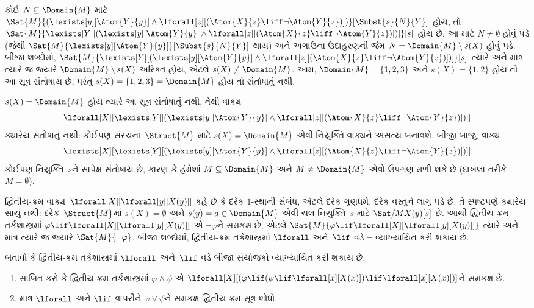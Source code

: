 \begin{ex}
  કોઈ $N \subseteq \Domain{M}$ માટે
  $\Sat{M}{(\lexists[y][\Atom{Y}{y}] \land \lforall[z][(\Atom{X}{z}
  \liff \lnot \Atom{Y}{z})])}[\Subst{s}{N}{Y}]$ હોય, તો
  $\Sat{M}{\lexists[Y][(\lexists[y][\Atom{Y}{y}] \land
  \lforall[z][(\Atom{X}{z} \liff \lnot \Atom{Y}{z})])]}[s]$ હોય છે.
  આ માટે $N \neq \emptyset$ હોવું પડે (જેથી
  $\Sat{M}{\lexists[y][\Atom{Y}{y}]}[\Subst{s}{N}{Y}]$ થાય) અને
  અગાઉના ઉદાહરણની જેમ $N = \Domain{M} \setminus s(X)$ હોવું પડે.
  બીજા શબ્દોમાં,
  $\Sat{M}{\lexists[Y][(\lexists[y][\Atom{Y}{y}] \land
  \lforall[z][(\Atom{X}{z} \liff \lnot \Atom{Y}{z})])]}[s]$
  ત્યારે અને માત્ર ત્યારે જ જ્યારે $\Domain{M} \setminus s(X)$
  અરિક્ત હોય, એટલે $s(X) \neq \Domain{M}$. આમ,
  $\Domain{M} = \{1, 2, 3\}$ અને $s(X) = \{1, 2\}$ હોય તો આ
  સૂત્ર સંતોષાય છે, પરંતુ $s(X) = \{1, 2, 3\} = \Domain{M}$
  હોય તો સંતોષાતું નથી.

  $s(X) = \Domain{M}$ હોય ત્યારે આ સૂત્ર સંતોષાતું નથી, તેથી
  વાક્ય
  \[
  \lforall[X][\lexists[Y][(\lexists[y][\Atom{Y}{y}] \land
      \lforall[z][(\Atom{X}{z} \liff \lnot \Atom{Y}{z})])]]
  \]
  ક્યારેય સંતોષાતું નથી: કોઈપણ સંરચના~$\Struct{M}$ માટે
  $s(X) = \Domain{M}$ એવી નિયુક્તિ વાક્યને અસત્ય બનાવશે.
  બીજી બાજુ, વાક્ય
  \[
  \lexists[X][\lexists[Y][(\lexists[y][\Atom{Y}{y}] \land
      \lforall[z][(\Atom{X}{z} \liff \lnot \Atom{Y}{z})])]]
  \]
  કોઈપણ નિયુક્તિ~$s$ને સાપેક્ષ સંતોષાય છે, કારણ કે હંમેશાં
  $M \subseteq \Domain{M}$ અને $M \neq \Domain{M}$ એવો ઉપગણ મળી
  શકે છે (દાખલા તરીકે $M = \emptyset$).
\end{ex}

\begin{ex}
  દ્વિતીય-ક્રમ વાક્ય~$\lforall[X][\lforall[y][X(y)]]$ કહે છે
  કે દરેક $1$-સ્થાની સંબંધ, એટલે દરેક ગુણધર્મ, દરેક વસ્તુને લાગુ પડે
  છે. તે સ્પષ્ટપણે ક્યારેય સાચું નથી: દરેક~$\Struct{M}$માં
  $s(X) = \emptyset$ અને $s(y) = a \in \Domain{M}$ એવી
  ચલ-નિયુક્તિ~$s$ માટે $\Sat/{M}{X(y)}[s]$ છે. આથી દ્વિતીય-ક્રમ
  તર્કશાસ્ત્રમાં $\varphi \lif \lforall[X][\lforall[y][X(y)]]$ એ
  $\lnot \varphi$ને સમકક્ષ છે, એટલે
  $\Sat{M}{\varphi \lif
  \lforall[X][\lforall[y][X(y)]]}$ ત્યારે અને માત્ર ત્યારે જ
  જ્યારે $\Sat{M}{\lnot \varphi}$. બીજા શબ્દોમાં, દ્વિતીય-ક્રમ
  તર્કશાસ્ત્રમાં $\lforall$ અને~$\lif$ વડે $\lnot$ વ્યાખ્યાયિત
  કરી શકાય છે.
\end{ex}

\begin{prob}
  બતાવો કે દ્વિતીય-ક્રમ તર્કશાસ્ત્રમાં $\lforall$ અને~$\lif$ વડે
  બીજા સંયોજકો વ્યાખ્યાયિત કરી શકાય છે:
  \begin{enumerate}
    \item સાબિત કરો કે દ્વિતીય-ક્રમ તર્કશાસ્ત્રમાં $\varphi \land \psi$ એ
    $\lforall[X][(\varphi \lif (\psi \lif \lforall[x][X(x)])\lif
    \lforall[x][X(x)])]$ને સમકક્ષ છે.
    \item માત્ર $\lforall$ અને $\lif$ વાપરીને $\varphi \lor \psi$ને
    સમકક્ષ દ્વિતીય-ક્રમ સૂત્ર શોધો.
  \end{enumerate}
\end{prob}




